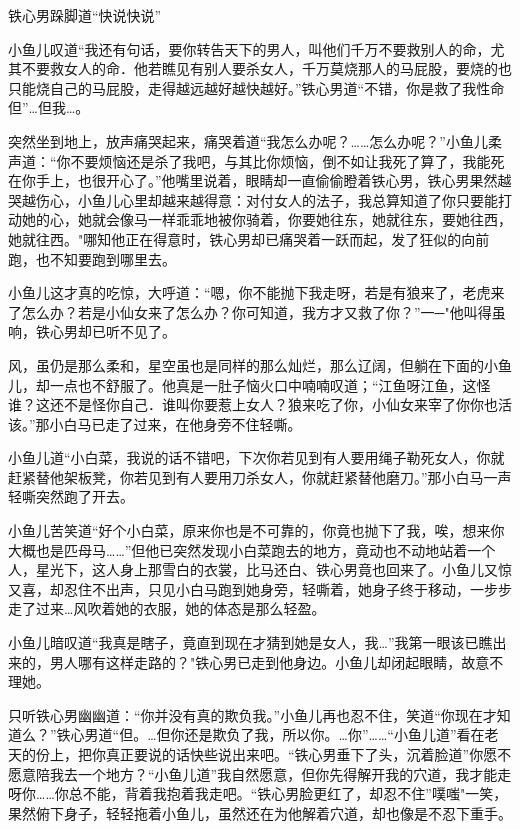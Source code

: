 \documentclass[12pt,oneside]{book}
\begin{document}
铁心男跺脚道``快说快说''

小鱼儿叹道``我还有句话，要你转告天下的男人，叫他们千万不要救别人的命，尤其不要救女人的命．他若瞧见有别人要杀女人，千万莫烧那人的马屁股，要烧的也只能烧自己的马屁股，走得越远越好越快越好。''铁心男道``不错，你是救了我性命但''\ldots 但我\ldots。

突然坐到地上，放声痛哭起来，痛哭着道``我怎么办呢？\ldots\ldots 怎么办呢？''小鱼儿柔声道：``你不要烦恼还是杀了我吧，与其比你烦恼，倒不如让我死了算了，我能死在你手上，也很开心了。''他嘴里说着，眼睛却一直偷偷瞪着铁心男，铁心男果然越哭越伤心，小鱼儿心里却越来越得意：对付女人的法子，我总算知道了你只要能打动她的心，她就会像马一样乖乖地被你骑着，你要她往东，她就往东，要她往西，她就往西。"哪知他正在得意时，铁心男却已痛哭着一跃而起，发了狂似的向前跑，也不知要跑到哪里去。

小鱼儿这才真的吃惊，大呼道：``嗯，你不能抛下我走呀，若是有狼来了，老虎来了怎么办？若是小仙女来了怎么办？你可知道，我方才又救了你？''一─"他叫得虽响，铁心男却已听不见了。

风，虽仍是那么柔和，星空虽也是同样的那么灿烂，那么辽阔，但躺在下面的小鱼儿，却一点也不舒服了。他真是一肚子恼火口中喃喃叹道；``江鱼呀江鱼，这怪谁？这还不是怪你自己．谁叫你要惹上女人？狼来吃了你，小仙女来宰了你你也活该。''那小白马已走了过来，在他身旁不住轻嘶。

小鱼儿道``小白菜，我说的话不错吧，下次你若见到有人要用绳子勒死女人，你就赶紧替他架板凳，你若见到有人要用刀杀女人，你就赶紧替他磨刀。''那小白马一声轻嘶突然跑了开去。

小鱼儿苦笑道``好个小白菜，原来你也是不可靠的，你竟也抛下了我，唉，想来你大概也是匹母马\ldots\ldots{}''但他已突然发现小白菜跑去的地方，竟动也不动地站着一个人，星光下，这人身上那雪白的衣裳，比马还白、铁心男竟也回来了。小鱼儿又惊又喜，却忍住不出声，只见小白马跑到她身旁，轻嘶着，她身子终于移动，一步步走了过来\ldots 风吹着她的衣服，她的体态是那么轻盈。

小鱼儿暗叹道``我真是瞎子，竟直到现在才猜到她是女人，我\ldots{}''我第一眼该已瞧出来的，男人哪有这样走路的？"铁心男已走到他身边。小鱼儿却闭起眼睛，故意不理她。

只听铁心男幽幽道：``你并没有真的欺负我。''小鱼儿再也忍不住，笑道``你现在才知道么？''铁心男道``但。\ldots 但你还是欺负了我，所以你。\ldots 你''\ldots\ldots{}``小鱼儿道''看在老天的份上，把你真正要说的话快些说出来吧。``铁心男垂下了头，沉着脸道''你愿不愿意陪我去一个地方？``小鱼儿道''我自然愿意，但你先得解开我的穴道，我才能走呀你\ldots\ldots 你总不能，背着我抱着我走吧。``铁心男脸更红了，却忍不住''噗嗤"一笑，果然俯下身子，轻轻拖着小鱼儿，虽然还在为他解着穴道，却也像是不忍下重手。
\end{document}
